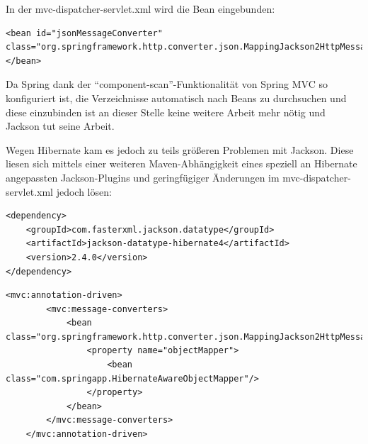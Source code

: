 In der mvc-dispatcher-servlet.xml wird die Bean eingebunden:
\lstset{language=xml}
\begin{lstlisting}[frame=htrbl, caption={Konfiguration von Jackson}, breaklines=true]
<bean id="jsonMessageConverter" class="org.springframework.http.converter.json.MappingJackson2HttpMessageConverter">
</bean>
\end{lstlisting}

Da Spring dank der ``component-scan''-Funktionalität von Spring MVC so konfiguriert ist, die Verzeichnisse automatisch nach Beans zu durchsuchen und diese einzubinden ist an dieser Stelle keine weitere Arbeit mehr nötig und Jackson tut seine Arbeit.

Wegen Hibernate kam es jedoch zu teils größeren Problemen mit Jackson. Diese liesen sich mittels einer weiteren Maven-Abhängigkeit eines speziell an Hibernate angepassten Jackson-Plugins und geringfügiger Änderungen im mvc-dispatcher-servlet.xml jedoch lösen:
\lstset{language=xml}
\begin{lstlisting}[frame=htrbl, caption={Einbindung von Jackson-datatype-hibernate4 in Maven}, breaklines=true]
<dependency>
	<groupId>com.fasterxml.jackson.datatype</groupId>
	<artifactId>jackson-datatype-hibernate4</artifactId>
	<version>2.4.0</version>
</dependency>
\end{lstlisting}
\lstset{language=xml}
\begin{lstlisting}[frame=htrbl, caption={Konfiguration von Jackson und Hibernate}, breaklines=true]
<mvc:annotation-driven>
        <mvc:message-converters>
            <bean class="org.springframework.http.converter.json.MappingJackson2HttpMessageConverter">
                <property name="objectMapper">
                    <bean class="com.springapp.HibernateAwareObjectMapper"/>
                </property>
            </bean>
        </mvc:message-converters>
    </mvc:annotation-driven>
\end{lstlisting}